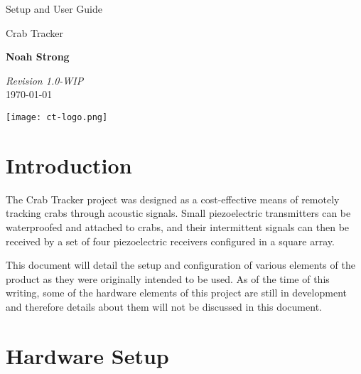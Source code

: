 \documentclass[12pt]{article}
\begin{document}
\begin{titlepage}

\vspace*{5cm}

\begin{huge}
Setup and User Guide
\end{huge}

\begin{large}
Crab Tracker

\vspace*{1cm}

\textbf{Noah Strong}

\vspace*{1cm}
\end{large}

\textit{Revision 1.0-WIP}\\
\today

\vfill
\hfill \texttt{[image: ct-logo.png]}

\end{titlepage}
\tableofcontents{}

\newpage

\section{Introduction}

The Crab Tracker project was designed as a cost-effective means of remotely
tracking crabs through acoustic signals.
Small piezoelectric transmitters can be waterproofed and attached to crabs,
and their intermittent signals can then be received by a set of four
piezoelectric receivers configured in a square array.

This document will detail the setup and configuration of various elements
of the product as they were originally intended to be used.
As of the time of this writing, some of the hardware elements of this project
are still in development and therefore details about them will not be discussed
in this document.

\section{Hardware Setup}
\end{document}
